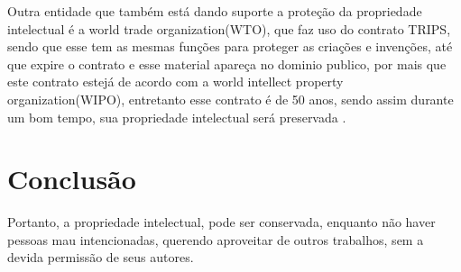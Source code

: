 \documentclass[12pt]{article}
\begin{document}
Outra entidade que também está dando suporte a proteção da propriedade intelectual é a
world trade organization(WTO), que faz uso do contrato TRIPS, sendo que esse tem as mesmas
funções para proteger as criações e invenções, até que expire o contrato e esse material apareça 
no dominio publico, por mais que este contrato estejá de acordo com a world intellect property organization(WIPO), entretanto esse contrato é de 50 anos, sendo assim durante um bom tempo, sua propriedade intelectual será preservada \cite{TRIPS}.

\section{Conclusão}\label{sec:conclusao}
Portanto, a propriedade intelectual, pode ser conservada, enquanto não haver pessoas mau intencionadas, querendo aproveitar de outros trabalhos, sem a devida permissão de seus autores.



\end{document}
